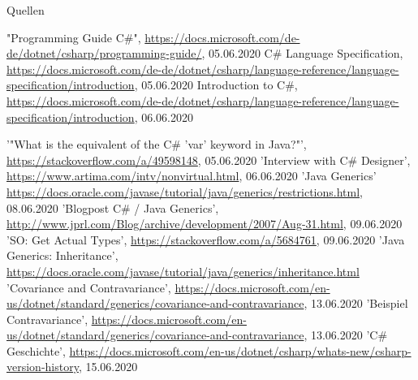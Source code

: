 \documentclass[11pt]{beamer}
\begin{document}

\begin{frame}{Quellen}
\begin{thebibliography}{99}
\fontsize{6pt}{7.2}\selectfont
	"Programming Guide C\#", \url{https://docs.microsoft.com/de-de/dotnet/csharp/programming-guide/}, 05.06.2020
	 C\# Language Specification, \url{https://docs.microsoft.com/de-de/dotnet/csharp/language-reference/language-specification/introduction}, 05.06.2020
   Introduction to C\#, \url{https://docs.microsoft.com/de-de/dotnet/csharp/language-reference/language-specification/introduction}, 06.06.2020

 '"What is the equivalent of the C\# 'var' keyword in Java?"', 
 \url{https://stackoverflow.com/a/49598148}, 05.06.2020
 'Interview with C\# Designer', \url{https://www.artima.com/intv/nonvirtual.html}, 06.06.2020
  'Java Generics' \url{https://docs.oracle.com/javase/tutorial/java/generics/restrictions.html}, 08.06.2020
  'Blogpost C\# / Java Generics', \url{http://www.jprl.com/Blog/archive/development/2007/Aug-31.html}, 09.06.2020
  'SO: Get Actual Types', \url{https://stackoverflow.com/a/5684761}, 09.06.2020
  'Java Generics: Inheritance', \url{https://docs.oracle.com/javase/tutorial/java/generics/inheritance.html}
  'Covariance and Contravariance', \url{https://docs.microsoft.com/en-us/dotnet/standard/generics/covariance-and-contravariance}, 13.06.2020
  'Beispiel Contravariance', \url{https://docs.microsoft.com/en-us/dotnet/standard/generics/covariance-and-contravariance}, 13.06.2020
 'C\# Geschichte', \url{https://docs.microsoft.com/en-us/dotnet/csharp/whats-new/csharp-version-history}, 15.06.2020
\end{thebibliography}
\end{frame}
\end{document}
